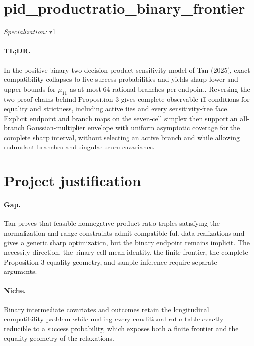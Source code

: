 \documentclass{article}
\begin{document}
\sloppy

\section*{pid\_\allowbreak{}productratio\_\allowbreak{}binary\_\allowbreak{}frontier}

\noindent\textit{Specialization:} v1\par

\paragraph{TL;DR.} In the positive binary two-decision product sensitivity model of Tan (2025), exact compatibility collapses to five success probabilities and yields sharp lower and upper bounds for \(\mu_{11}\) as at most \(64\) rational branches per endpoint. Reversing the two proof chains behind Proposition 3 gives complete observable iff conditions for equality and strictness, including active ties and every sensitivity-free face. Explicit endpoint and branch maps on the seven-cell simplex then support an all-branch Gaussian-multiplier envelope with uniform asymptotic coverage for the complete sharp interval, without selecting an active branch and while allowing redundant branches and singular score covariance.

\section{Project justification}

\paragraph{Gap.} Tan proves that feasible nonnegative product-ratio triples satisfying the normalization and range constraints admit compatible full-data realizations and gives a generic sharp optimization, but the binary endpoint remains implicit. The necessity direction, the binary-cell mean identity, the finite frontier, the complete Proposition 3 equality geometry, and sample inference require separate arguments.

\paragraph{Niche.} Binary intermediate covariates and outcomes retain the longitudinal compatibility problem while making every conditional ratio table exactly reducible to a success probability, which exposes both a finite frontier and the equality geometry of the relaxations.
\end{document}
